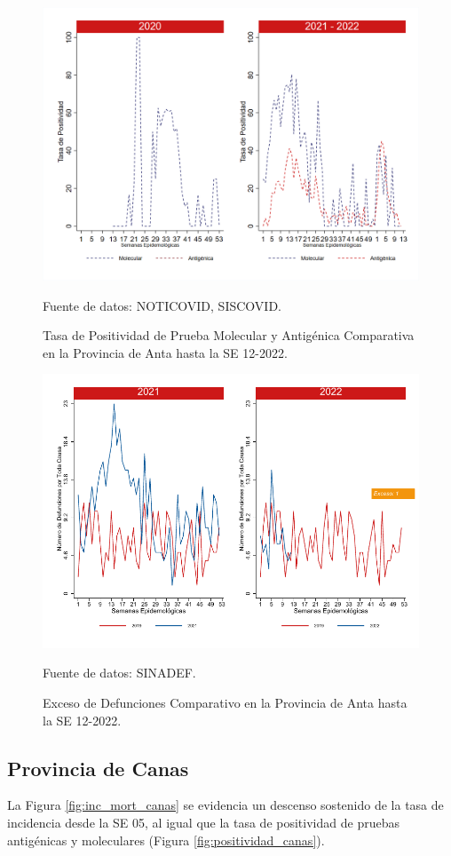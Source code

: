 \documentclass[12pt,a4paper,openany]{book}
\begin{document}
		\begin{figure}[h]
			\caption{Tasa de Positividad de Prueba Molecular y Antigénica Comparativa en la Provincia de Anta hasta la SE 12-2022.}\label{fig:positividad_anta}
			\begin{center}
				\includegraphics[width=0.7\linewidth]{../figuras/positividad_20_21_2.png}
			\end{center}
			{\footnotesize {Fuente de datos: NOTICOVID, SISCOVID.}}
		\end{figure}
		
		\begin{figure}[h]
			\caption{Exceso de Defunciones Comparativo en la Provincia de Anta hasta la SE 12-2022.}\label{fig:exceso_anta}
			\begin{center}
				\includegraphics[width=0.7\linewidth]{../figuras/exceso_2.pdf}
			\end{center}
			{\footnotesize {Fuente de datos: SINADEF.}}
		\end{figure}
		
		\clearpage
		
		\subsection*{Provincia de Canas}
		\noindent La Figura \ref{fig:inc_mort_canas} se evidencia un descenso sostenido de la tasa de incidencia desde la SE 05, al igual que la tasa de positividad de pruebas antigénicas y moleculares (Figura \ref{fig:positividad_canas}). 
		
\end{document}
